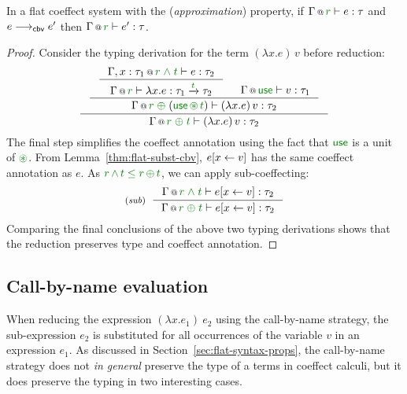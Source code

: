 \begin{theorem}
\label{thm:cbv-reduction}
In a flat coeffect system with the (\emph{approxi\-mation}) property, 
if $\coctx{\Gamma}{\cclrd{r}} \vdash e : \tau$ 
and $e \longrightarrow_{\textnormal{\sffamily cbv}} e'$ then $\coctx{\Gamma}{\cclrd{r}} \vdash e' : \tau$.
\end{theorem}
\begin{proof}
Consider the typing derivation for the term $(\lambda x.e)\,v$ before reduction:
\begin{equation*}
\inference
  { \inference
  { \inference
      {\coctx{\Gamma, x:\tau_1}{\cclrd{r}\;\czip\;\cclrd{t}} \vdash e : \tau_2}
      {\coctx{\Gamma}{\cclrd{r}} \vdash \lambda x.e : \tau_1 \xrightarrow{\cclrd{t}} \tau_2 } &
   \coctx{\Gamma}{\cunit} \vdash v : \tau_1 }
  {\coctx{\Gamma}{\cclrd{r} \;\cpar\; (\cunit \,\cseq\, \cclrd{t})} \vdash (\lambda x.e)\,v : \tau_2} }
  {\coctx{\Gamma}{\cclrd{r} \;\cpar\; \cclrd{t}} \vdash (\lambda x.e)\,v : \tau_2}
\end{equation*}
The final step simplifies the coeffect annotation using the fact that $\cunit$ is a unit of $\cseq$.
From Lemma~\ref{thm:flat-subst-cbv}, $e[x \leftarrow v]$ has the same coeffect annotation as $e$.
As $\cclrd{r}\,\czip\,\cclrd{t}\;\cleq\;\cclrd{r}\,\cpar\,\cclrd{t}$, we can apply sub-coeffecting:
%
\begin{equation*}
\tyrule{sub}
 { \coctx{\Gamma}{\cclrd{r}\;\czip\;\cclrd{t}} \vdash \subst{e}{x}{v} : \tau_2 }
 { \coctx{\Gamma}{\cclrd{r}\;\cpar\;\cclrd{t}} \vdash \subst{e}{x}{v} : \tau_2 } 
\end{equation*}
%
Comparing the final conclusions of the above two typing derivations shows that 
the reduction preserves type and coeffect annotation.
\end{proof}


\subsection{Call-by-name evaluation}
\label{sec:flat-syntax-cbn}

When reducing the expression $(\lambda x.e_1)~e_2$ using the call-by-name strategy, the 
sub-expression $e_2$ is substituted for all occurrences of the variable $v$ in an expression $e_1$. 
As discussed in Section~\ref{sec:flat-syntax-props}, the call-by-name strategy does not \emph{in 
general} preserve the type of a terms in coeffect calculi, but it does preserve the typing in two 
interesting cases. 

